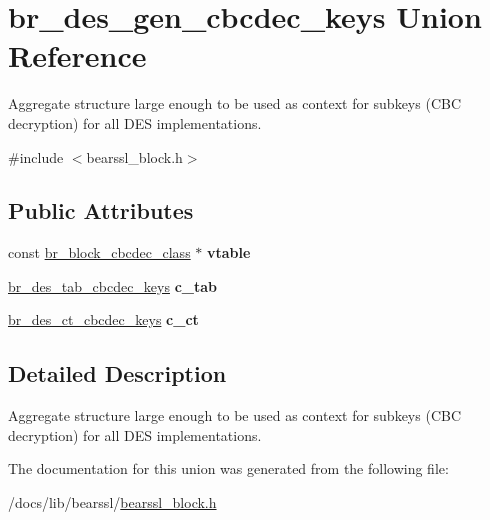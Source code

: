 \hypertarget{unionbr__des__gen__cbcdec__keys}{}\section{br\+\_\+des\+\_\+gen\+\_\+cbcdec\+\_\+keys Union Reference}
\label{unionbr__des__gen__cbcdec__keys}


Aggregate structure large enough to be used as context for subkeys (C\+BC decryption) for all D\+ES implementations.  




{\ttfamily \#include $<$bearssl\+\_\+block.\+h$>$}

\subsection*{Public Attributes}
\begin{DoxyCompactItemize}
\item 
\mbox{\label{unionbr__des__gen__cbcdec__keys_a28861f918aae4ab98494270cd324053e}} 
const \hyperlink{bearssl__block_8h_a5542970c820eeee2e62766368be8fb7f}{br\+\_\+block\+\_\+cbcdec\+\_\+class} $\ast$ {\bfseries vtable}
\item 
\mbox{\label{unionbr__des__gen__cbcdec__keys_a640cb5a655fe63ea609406120aa1e802}} 
\hyperlink{structbr__des__tab__cbcdec__keys}{br\+\_\+des\+\_\+tab\+\_\+cbcdec\+\_\+keys} {\bfseries c\+\_\+tab}
\item 
\mbox{\label{unionbr__des__gen__cbcdec__keys_af40875468665648db00a5fa559e9fa2b}} 
\hyperlink{structbr__des__ct__cbcdec__keys}{br\+\_\+des\+\_\+ct\+\_\+cbcdec\+\_\+keys} {\bfseries c\+\_\+ct}
\end{DoxyCompactItemize}


\subsection{Detailed Description}
Aggregate structure large enough to be used as context for subkeys (C\+BC decryption) for all D\+ES implementations. 

The documentation for this union was generated from the following file\+:\begin{DoxyCompactItemize}
\item 
/docs/lib/bearssl/\hyperlink{bearssl__block_8h}{bearssl\+\_\+block.\+h}\end{DoxyCompactItemize}
